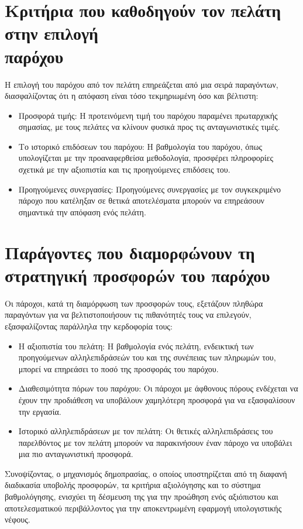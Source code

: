 \section{Κριτήρια που καθοδηγούν τον πελάτη στην επιλογή \\παρόχου}
Η επιλογή του παρόχου από τον πελάτη επηρεάζεται από μια σειρά παραγόντων, διασφαλίζοντας ότι η απόφαση είναι τόσο τεκμηριωμένη όσο και βέλτιστη:
\begin{itemize}
    \item Προσφορά τιμής: Η προτεινόμενη τιμή του παρόχου παραμένει πρωταρχικής σημασίας, με τους πελάτες να κλίνουν φυσικά προς τις ανταγωνιστικές τιμές.
    \item Το ιστορικό επιδόσεων του παρόχου: Η βαθμολογία του παρόχου, όπως υπολογίζεται με την προαναφερθείσα μεθοδολογία, προσφέρει πληροφορίες σχετικά με την αξιοπιστία και τις προηγούμενες επιδόσεις του.
    \item Προηγούμενες συνεργασίες: Προηγούμενες συνεργασίες με τον συγκεκριμένο πάροχο που κατέληξαν σε θετικά αποτελέσματα μπορούν να επηρεάσουν σημαντικά την απόφαση ενός πελάτη.
\end{itemize}

\section{Παράγοντες που διαμορφώνουν τη στρατηγική προσφορών του παρόχου}
Οι πάροχοι, κατά τη διαμόρφωση των προσφορών τους, εξετάζουν πληθώρα παραγόντων για να βελτιστοποιήσουν τις πιθανότητές τους να επιλεγούν, εξασφαλίζοντας παράλληλα την κερδοφορία τους:
\begin{itemize}
    \item Η αξιοπιστία του πελάτη: Η βαθμολογία ενός πελάτη, ενδεικτική των προηγούμενων αλληλεπιδράσεών του και της συνέπειας των πληρωμών του, μπορεί να επηρεάσει το ποσό της προσφοράς του παρόχου.
    \item Διαθεσιμότητα πόρων του παρόχου: Οι πάροχοι με άφθονους πόρους ενδέχεται να έχουν την προδιάθεση να υποβάλουν χαμηλότερη προσφορά για να εξασφαλίσουν την εργασία.
    \item Ιστορικό αλληλεπιδράσεων με τον πελάτη: Οι θετικές αλληλεπιδράσεις του παρελθόντος με τον πελάτη μπορούν να παρακινήσουν έναν πάροχο να υποβάλει μια πιο ανταγωνιστική προσφορά.
\end{itemize}

Συνοψίζοντας, ο μηχανισμός δημοπρασίας, ο οποίος υποστηρίζεται από τη διαφανή διαδικασία υποβολής προσφορών, τα κριτήρια αξιολόγησης και το σύστημα βαθμολόγησης, ενισχύει τη δέσμευση της  για την προώθηση ενός αξιόπιστου και αποτελεσματικού περιβάλλοντος για την αποκεντρωμένη εφαρμογή υπολογιστικής νέφους.
